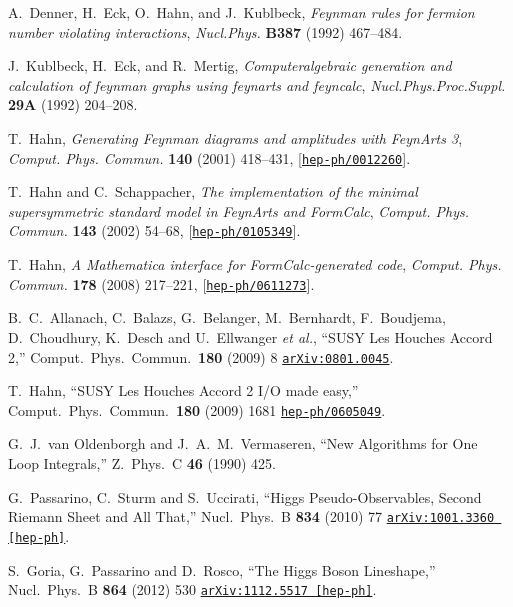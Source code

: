 \documentclass[english,12pt]{article}
\begin{document}
\begin{thebibliography}{10}
A.~Denner, H.~Eck, O.~Hahn, and J.~Kublbeck, {\it {Feynman rules for fermion
  number violating interactions}},  {\em Nucl.Phys.} {\bf B387} (1992)
  467--484.

J.~Kublbeck, H.~Eck, and R.~Mertig, {\it Computeralgebraic generation and
  calculation of feynman graphs using feynarts and feyncalc},  {\em
  Nucl.Phys.Proc.Suppl.} {\bf 29A} (1992) 204--208.

T.~Hahn, {\it {Generating Feynman diagrams and amplitudes with FeynArts 3}},
  {\em Comput. Phys. Commun.} {\bf 140} (2001) 418--431,
  [\href{http://www.arXiv.org/abs/hep-ph/0012260}{{\tt hep-ph/0012260}}].

T.~Hahn and C.~Schappacher, {\it {The implementation of the minimal
  supersymmetric standard model in FeynArts and FormCalc}},  {\em Comput. Phys.
  Commun.} {\bf 143} (2002) 54--68,
  [\href{http://www.arXiv.org/abs/hep-ph/0105349}{{\tt hep-ph/0105349}}].

T.~Hahn, {\it {A Mathematica interface for FormCalc-generated code}},  {\em
  Comput. Phys. Commun.} {\bf 178} (2008) 217--221,
  [\href{http://www.arXiv.org/abs/hep-ph/0611273}{{\tt hep-ph/0611273}}].

  B.~C.~Allanach, C.~Balazs, G.~Belanger, M.~Bernhardt, F.~Boudjema, D.~Choudhury, K.~Desch and U.~Ellwanger {\it et al.},
  ``SUSY Les Houches Accord 2,''
  Comput.\ Phys.\ Commun.\  {\bf 180} (2009) 8
  \href{http://arxiv.org/abs/0801.0045}{\tt arXiv:0801.0045}.

  T.~Hahn,
  ``SUSY Les Houches Accord 2 I/O made easy,''
  Comput.\ Phys.\ Commun.\  {\bf 180} (2009) 1681
  \href{http://arxiv.org/abs/hep-ph/0605049}{\tt hep-ph/0605049}.

  G.~J.~van Oldenborgh and J.~A.~M.~Vermaseren,
  ``New Algorithms for One Loop Integrals,''
  Z.\ Phys.\ C {\bf 46} (1990) 425.

  G.~Passarino, C.~Sturm and S.~Uccirati,
  ``Higgs Pseudo-Observables, Second Riemann Sheet and All That,''
  Nucl.\ Phys.\ B {\bf 834} (2010) 77
  \href{http://arxiv.org/abs/1001.3360}{\tt arXiv:1001.3360 [hep-ph]}.

  S.~Goria, G.~Passarino and D.~Rosco,
  ``The Higgs Boson Lineshape,''
  Nucl.\ Phys.\ B {\bf 864} (2012) 530
  \href{http://arxiv.org/abs/1112.5517}{\tt arXiv:1112.5517 [hep-ph]}.


\end{thebibliography}
\end{document}
